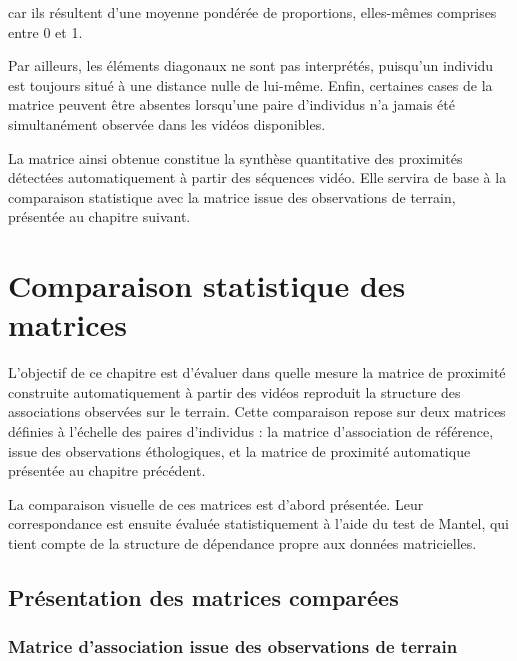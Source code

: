 \documentclass[11pt,a4paper]{report}
\begin{document}
car ils résultent d'une moyenne pondérée de proportions, elles-mêmes comprises
entre 0 et 1.

Par ailleurs, les éléments diagonaux ne sont pas interprétés, puisqu'un individu
est toujours situé à une distance nulle de lui-même. Enfin, certaines cases de
la matrice peuvent être absentes lorsqu'une paire d'individus n'a jamais été
simultanément observée dans les vidéos disponibles.

La matrice ainsi obtenue constitue la synthèse quantitative des proximités
détectées automatiquement à partir des séquences vidéo. Elle servira de base à
la comparaison statistique avec la matrice issue des observations de terrain,
présentée au chapitre suivant. 


\chapter{Comparaison statistique des matrices}
\label{chap:comparaison}

L'objectif de ce chapitre est d'évaluer dans quelle mesure la matrice de
proximité construite automatiquement à partir des vidéos reproduit la
structure des associations observées sur le terrain. Cette comparaison
repose sur deux matrices définies à l'échelle des paires d'individus :
la matrice d'association de référence, issue des observations
éthologiques, et la matrice de proximité automatique présentée au
chapitre précédent.

La comparaison visuelle de ces matrices est d'abord présentée. Leur
correspondance est ensuite évaluée statistiquement à l'aide du test de
Mantel, qui tient compte de la structure de dépendance propre aux données
matricielles.


\section{Présentation des matrices comparées}
\label{sec:matrices_comparees}

\subsection*{Matrice d'association issue des observations de terrain}
\end{document}

